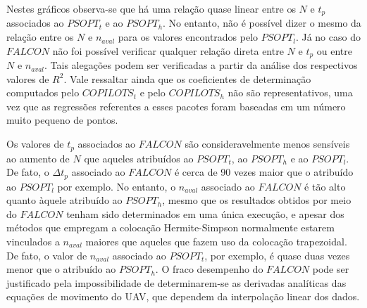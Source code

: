 Nestes gráficos observa-se que há uma relação quase linear entre os $ N $ e $ t_p $ associados ao $ PSOPT_t $ e ao $ PSOPT_h $. No entanto, não é possível dizer o mesmo da relação entre os $ N $ e $ n_{aval} $ para os valores encontrados pelo $ PSOPT_l $. Já no caso do $ FALCON $ não foi possível verificar qualquer relação direta entre $ N $ e $ t_p $ ou entre $ N $ e $ n_{aval} $. Tais alegações podem ser verificadas a partir da análise dos respectivos valores de $ R^2 $. Vale ressaltar ainda que os coeficientes de determinação computados pelo $ COPILOTS_t $ e pelo $ COPILOTS_h $ não são representativos, uma vez que as regressões referentes a esses pacotes foram baseadas em um número muito pequeno de pontos. 

Os valores de $ t_p $ associados ao $ FALCON $ são consideravelmente menos sensíveis ao aumento de $ N $ que aqueles atribuídos ao $ PSOPT_t $, ao $ PSOPT_h $ e ao $ PSOPT_l $. De fato, o $ \Delta t_p $ associado ao $ FALCON $ é cerca de 90 vezes maior que o atribuído ao $ PSOPT_l $ por exemplo. No entanto, o $ n_{aval} $ associado ao $ FALCON $ é tão alto quanto àquele atribuído ao $ PSOPT_h $, mesmo que os resultados obtidos por meio do $ FALCON $ tenham sido determinados em uma única execução, e apesar dos métodos que empregam a colocação Hermite-Simpson normalmente estarem vinculados a $ n_{aval} $ maiores que aqueles que fazem uso da colocação trapezoidal. De fato, o valor de $ n_{aval} $ associado ao $ PSOPT_t $, por exemplo, é quase duas vezes menor que o atribuído ao $ PSOPT_h $. O fraco desempenho do $ FALCON $ pode ser justificado pela impossibilidade de determinarem-se as derivadas analíticas das equações de movimento do UAV, que dependem da interpolação linear dos dados. 

